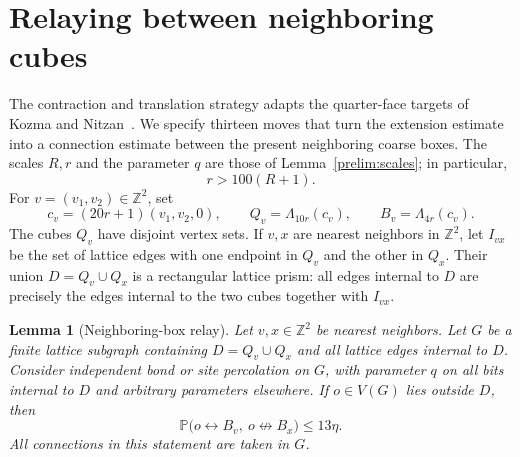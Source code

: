 \documentclass[11pt]{article}
\newtheorem{lemma}[theorem]{Lemma}
\theoremstyle{definition}
\theoremstyle{remark}
\numberwithin{equation}{section}
\begin{document}
\section{Relaying between neighboring cubes}\label{sec:geometry}

The contraction and translation strategy adapts the quarter-face targets
of Kozma and Nitzan~\cite[Section~4, Lemmas~11--12]{KozmaNitzan2024}.
We specify thirteen moves that turn the extension estimate into a connection
estimate between the present neighboring coarse boxes. The scales $R,r$ and the parameter $q$ are those of
Lemma~\ref{prelim:scales}; in particular,
\begin{equation}\label{geom:separation}
  r>100(R+1).
\end{equation}
For $v=(v_1,v_2)\in\mathbb Z^2$, set
\begin{equation}\label{geom:boxes}
  c_v=(20r+1)(v_1,v_2,0),\qquad
  Q_v=\Lambda_{10r}(c_v),\qquad
  B_v=\Lambda_{4r}(c_v).
\end{equation}
The cubes $Q_v$ have disjoint vertex sets. If $v,x$ are nearest neighbors in
$\mathbb Z^2$, let $I_{vx}$ be the set of lattice edges with one endpoint in
$Q_v$ and the other in $Q_x$. Their union $D=Q_v\cup Q_x$ is a rectangular
lattice prism: all edges internal to $D$ are precisely the edges internal to
the two cubes together with $I_{vx}$.

\begin{lemma}[Neighboring-box relay]\label{geom:relay}
Let $v,x\in\mathbb Z^2$ be nearest neighbors. Let $G$ be a finite lattice
subgraph containing $D=Q_v\cup Q_x$ and all lattice edges internal to $D$.
Consider independent bond or site percolation on $G$, with parameter $q$ on
all bits internal to $D$ and arbitrary parameters elsewhere. If $o\in V(G)$
lies outside $D$, then
\begin{equation}\label{geom:relay-bound}
  \mathbb P\bigl(o\leftrightarrow B_v,\ o\not\leftrightarrow B_x\bigr)
  \le 13\eta.
\end{equation}
All connections in this statement are taken in $G$.
\end{lemma}
\end{document}
